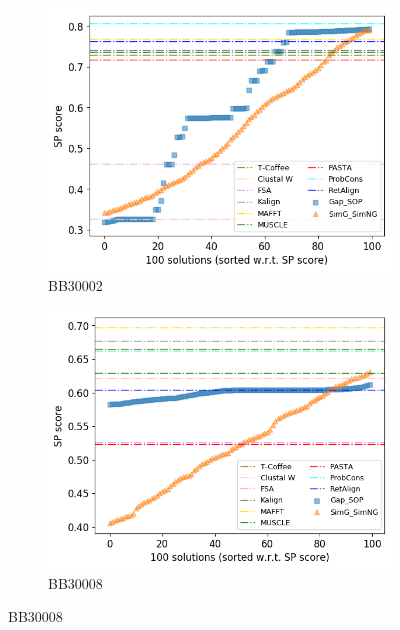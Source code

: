 \begin{figure}[!htbp]
	
	\begin{adjustwidth}{-1cm}{-1cm}
		\centering
		\begin{subfigure}{0.22\textwidth}
			\includegraphics[width=\columnwidth]{Figure/summary/precomputedInit/Balibase/BB30002_pairs_density_single_run_2}
			\caption{BB30002}
		\end{subfigure}	
		\begin{subfigure}{0.22\textwidth}
			\includegraphics[width=\columnwidth]{Figure/summary/precomputedInit/Balibase/BB30008_pairs_density_single_run_2}
			\caption{BB30008}

\end{subfigure}
\end{adjustwidth}
\end{figure}
